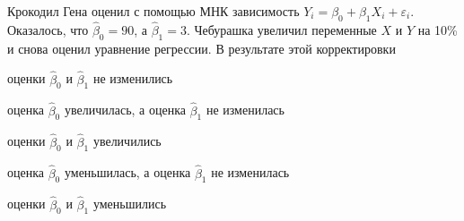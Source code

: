 
\begin{question}
Крокодил Гена оценил с помощью МНК зависимость
\(Y_i = \beta_0 + \beta_1 X_i + \varepsilon_i\). Оказалось, что
\(\hat \beta_0 = 90\), а \(\hat\beta_1 = 3\). Чебурашка увеличил
переменные \(X\) и \(Y\) на 10\% и снова оценил уравнение регрессии. В
результате этой корректировки
\begin{answerlist}
  \item оценки \(\hat\beta_0\) и \(\hat\beta_1\) не изменились
  \item оценка \(\hat\beta_0\) увеличилась, а оценка \(\hat\beta_1\) не
изменилась
  \item оценки \(\hat\beta_0\) и \(\hat\beta_1\) увеличились
  \item оценка \(\hat\beta_0\) уменьшилась, а оценка \(\hat\beta_1\) не
изменилась
  \item оценки \(\hat\beta_0\) и \(\hat\beta_1\) уменьшились
\end{answerlist}
\end{question}


